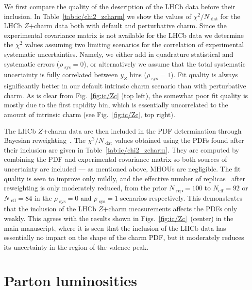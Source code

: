 We first compare the quality of the description of the LHCb data
before their inclusion. In Table~\ref{tab:ic/chi2_zcharm} we show the
values of $\chi^2/N_\textrm{ dat}$ for the LHCb $Z$+charm data
both with default and perturbative charm.
%
Since the experimental covariance matrix is not available for the LHCb
data we determine the $\chi^2$ values assuming two limiting scenarios
for the correlation of experimental systematic uncertainties.
%
Namely, 
we either add in quadrature statistical and systematic errors ($\rho_\textrm{ sys}=0$),
or alternatively we assume that the total systematic uncertainty
is fully correlated between $y_Z$ bins ($\rho_\textrm{ sys}=1$). Fit
quality is always significantly better in our default intrinsic charm
scenario than with perturbative charm.
%
As is clear from
Fig.~\ref{fig:ic/Zc} (top left), the somewhat poor fit quality is mostly due to the first
rapidity bin, which is essentially uncorrelated to the amount of
intrinsic charm (see
Fig.~\ref{fig:ic/Zc}, top right).

The LHCb $Z$+charm data are then included in the PDF determination
through
Bayesian reweighting~\cite{Ball:2010gb,Ball:2011gg}. The
$\chi^2/N_\textrm{ dat}$ values obtained using the PDFs found after their
inclusion are given in
Table~\ref{tab:ic/chi2_zcharm}.
%
They are computed by combining the PDF and
experimental covariance matrix so both sources of uncertainty are
included --- as mentioned above, MHOUs are negligible.
The fit quality is seen to improve only
mildly, and the effective number of
replicas~\cite{Ball:2010gb,Ball:2011gg} after reweighting
is only moderately reduced, from the prior $N_\textrm{ rep}=100$ to $N_\textrm{
eff}=92$ or $N_\textrm{ eff}=84$ in the
$\rho_\textrm{ sys}=0$ and $\rho_\textrm{ sys}=1$ scenarios respectively.
%
This
demonstrates that the inclusion of the LHCb $Z$+charm measurements  affects
the PDFs only weakly. This agrees with the results shown in 
Figs.~\ref{fig:ic/Zc}~(center) in
the main manuscript, where it is seen that the inclusion of the LHCb
data has essentially no impact on the shape of the charm PDF, but
it moderately reduces its uncertainty in the region of the valence peak.



\section{Parton luminosities}
\label{sec:ic/lumis}

